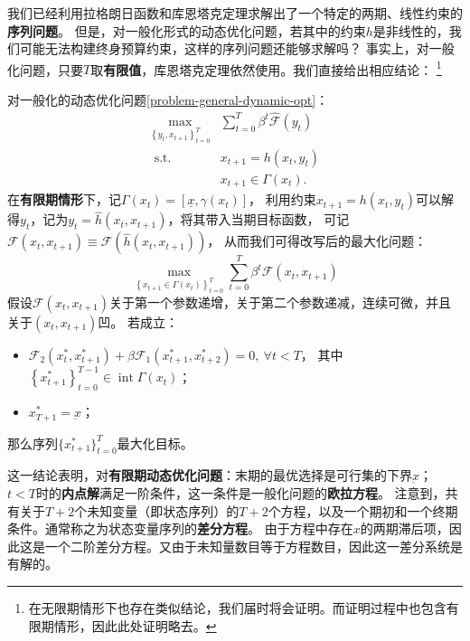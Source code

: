我们已经利用拉格朗日函数和库恩塔克定理求解出了一个特定的两期、线性约束的\textbf{序列问题}。
但是，对一般化形式的动态优化问题，若其中的约束$h$是非线性的，我们可能无法构建终身预算约束，这样的序列问题还能够求解吗？
事实上，对一般化问题，只要$T$取\textbf{有限值}，库恩塔克定理依然使用。我们直接给出相应结论：
\footnote{在无限期情形下也存在类似结论，我们届时将会证明。而证明过程中也包含有限期情形，因此此处证明略去。}
\begin{property}
    对一般化的动态优化问题\cref{problem-general-dynamic-opt}：
    \begin{equation*}
        \begin{aligned}
            \max _{\left\{y_t, x_{t+1}\right\}_{t=0}^T} & \sum_{t=0}^T \beta^t \hat{\mathcal{F}}\left(y_t\right) \\
            \text { s.t. } & x_{t+1}=h\left(x_t, y_t\right) \\
            & x_{t+1} \in \Gamma\left(x_t\right) .
        \end{aligned}
    \end{equation*}
    在\textbf{有限期情形}下，记$\Gamma\left(x_t\right)=\left[\underline{x}, \gamma\left(x_t\right)\right]$，
    利用约束$x_{t+1}=h(x_t,y_t)$可以解得$y_t$，记为$y_t=\hat{h}(x_t,x_{t+1})$，将其带入当期目标函数，
    可记$\mathcal{F}\left(x_t, x_{t+1}\right) \equiv \hat{\mathcal{F}}\left(\hat{h}\left(x_t, x_{t+1}\right)\right)$，
    从而我们可得改写后的最大化问题：
    \begin{equation*}
        \max _{\left\{x_{t+1} \in \Gamma\left(x_t\right)\right\}_{t=0}^T} 
            \sum_{t=0}^T \beta^t \mathcal{F}\left(x_t, x_{t+1}\right)
    \end{equation*}
    假设$\mathcal{F}\left(x_t, x_{t+1}\right)$关于第一个参数递增，关于第二个参数递减，连续可微，并且关于$(x_t,x_{t+1})$凹。
    若成立：
    \begin{itemize}
        \item $\mathcal{F}_2\left(x_t^*,x_{t+1}^*\right)+\beta\mathcal{F}_1\left(x_{t+1}^*,x_{t+2}^*\right)=0,~\forall t<T$，
            其中$\left\{x_{t+1}^*\right\}_{t=0}^{T-1} \in \operatorname{int} \Gamma\left(x_t\right)$；
        \item $x_{T+1}^{*}=\underbar{x}$；
    \end{itemize}
    那么序列$\{x_{t+1}^*\}_{t=0}^T$最大化目标。
\end{property}

这一结论表明，对\textbf{有限期动态优化问题}：末期的最优选择是可行集的下界$\underbar{x}$；
$t<T$时的\textbf{内点解}满足一阶条件，这一条件是一般化问题的\textbf{欧拉方程}。
注意到，共有关于$T+2$个未知变量（即状态序列）的$T+2$个方程，以及一个期初和一个终期条件。通常称之为状态变量序列的\textbf{差分方程}。
由于方程中存在$x$的两期滞后项，因此这是一个二阶差分方程。又由于未知量数目等于方程数目，因此这一差分系统是有解的。


